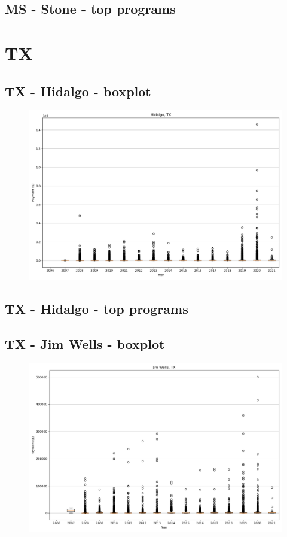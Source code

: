 \subsection*{MS - Stone - top programs}

\newpage
\section*{TX}
\subsection*{TX - Hidalgo - boxplot}
\begin{figure}[h]
\centering
\includegraphics[width=7in]{../output/boxplots/counties/Hidalgo-TX_boxplot.png}
\end{figure}


\subsection*{TX - Hidalgo - top programs}

\newpage
\subsection*{TX - Jim Wells - boxplot}
\begin{figure}[h]
\centering
\includegraphics[width=7in]{../output/boxplots/counties/Jim Wells-TX_boxplot.png}
\end{figure}


